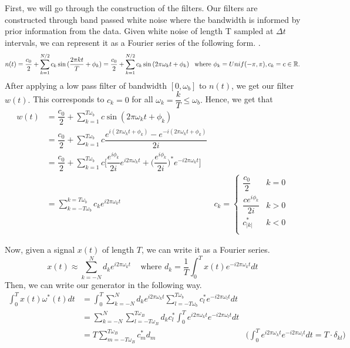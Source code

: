 \documentclass[11pt,letterpaper]{article}
\numberwithin{equation}{section} %
\numberwithin{figure}{section} %
\numberwithin{table}{section} %
\begin{document}
First, we will go through the construction of the filters. Our filters are constructed through band passed white noise where the bandwidth is informed by prior information from the data. Given white noise of length T sampled at $\Delta t$ intervals, we can represent it as a Fourier series of the following form. \cite{Grauer_2018}.
\[
n(t) = \dfrac{c_0}{2} + \sum_{k=1}^{N/2} c_k \sin{(\dfrac{2 \pi kt}{T} + \phi_k)} = \dfrac{c_0}{2} + \sum_{k=1}^{N/2} c_k \sin{(2 \pi \omega_k t + \phi_k)} \; \; \; \text{where $\phi_k = Unif(-\pi, \pi), c_k = c \in \mathbb{R}.$\\}
\]
After applying a low pass filter of bandwidth $[0, \omega_b]$ to $n(t)$, we get our filter $w(t).$ This corresponds to $c_k = 0$  for all $\omega_k = \dfrac{k}{T} \leq \omega_b.$ Hence, we get that 
\begin{align*}
	w(t) &= \dfrac{c_0}{2} + \sum_{k=1}^{T \omega_b} c \sin{(2 \pi \omega_k t + \phi_k)} \\
	&= \dfrac{c_0}{2} + \sum_{k=1}^{T \omega_b} c \dfrac{e^{i(2 \pi \omega_k t + \phi_k)} - e^{-i(2 \pi \omega_k t + \phi_k)}}{2i} \\
	&= \dfrac{c_0}{2} + \sum_{k=1}^{T\omega_b} c \bigg[ \dfrac{e^{i\phi_k}}{2i} e^{i 2 \pi \omega_k t} + \big(\dfrac{e^{i\phi_k}}{2i} \big)^*  e^{-i 2 \pi \omega_k t} \bigg] \\
	&= \sum_{k=-T\omega_b}^{k=T\omega_b} c_k e^{i2 \pi\omega_k t} & c_k = \begin{cases}
	\dfrac{c_0}{2} & k=0 \\
	\dfrac{ce^{i \phi_k}}{2i} & k > 0 \\
	c_{|k|}^* & k<0 \\
	\end{cases}
	\end{align*}

Now, given a signal $x(t)$ of length $T$, we can write it as a Fourier series.
\[
x(t) \approx \sum_{k=-N}^{N} d_k e^{i 2 \pi \omega_k t} \; \; \; \text{ where }d_k = \dfrac{1}{T} \int_0^T x(t) e^{-i2 \pi \omega_k t} dt  
\]
Then, we can write our generator in the following way.
\begin{align*}
	\int_0^T x(t) \omega^*(t) dt &= \int_0^T \sum_{k=-N}^N d_k e^{i 2 \pi \omega_k t} \sum_{l = -T \omega_b}^{T \omega_b} c_l^* e^{-i 2 \pi \omega_l t} dt \\
	&= \sum_{k=-N}^N \sum_{l=-T \omega_B}^{T \omega_B} d_k c_l^* \int_0^T e^{i 2 \pi \omega_k t} e^{-i 2 \pi \omega_l t} dt \\
	&= T \sum_{m=-T \omega_B}^{T \omega_B} c_m^* d_m & \bigg(\int_0^T e^{i 2 \pi \omega_k t} e^{-i 2 \pi \omega_l t} dt = T \cdot \delta_{kl} \bigg)
\end{align*}
\end{document}
